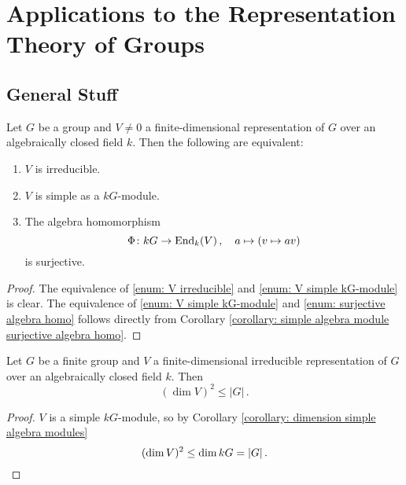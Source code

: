 \section{Applications to the Representation Theory of Groups}





\subsection*{General Stuff}


\begin{lemma}\label{lemma: equivalence to irreducible}
  Let $G$ be a group and $V \neq 0$ a finite-dimensional representation of $G$ over an algebraically closed field $k$. Then the following are equivalent:
  \begin{enumerate}[label=\emph{\roman*)},leftmargin=*]
    \item \label{enum: V irreducible}
      $V$ is irreducible.
    \item \label{enum: V simple kG-module}
      $V$ is simple as a $kG$-module.
    \item \label{enum: surjective algebra homo}
      The algebra homomorphism
      \[
                \Phi
        \colon  kG
        \to     \operatorname{End}_k(V) \,,
        \quad   a
        \mapsto (v \mapsto av)
      \]
      is surjective.
  \end{enumerate}
\end{lemma}
\begin{proof}
  The equivalence of \ref{enum: V irreducible} and \ref{enum: V simple kG-module} is clear.
  The equivalence of \ref{enum: V simple kG-module} and \ref{enum: surjective algebra homo} follows directly from Corollary \ref{corollary: simple algebra module surjective algebra homo}.
\end{proof}


\begin{corollary}
  Let $G$ be a finite group and $V$ a finite-dimensional irreducible representation of $G$ over an algebraically closed field $k$.
  Then
  \[
          \left( \dim V \right)^2
    \leq |G| \,.
  \]
\end{corollary}


\begin{proof}
  $V$ is a simple $kG$-module, so by Corollary \ref{corollary: dimension simple algebra modules}
  \[
          (\dim V)^2
    \leq  \dim kG
    =     |G| \,.
    \qedhere
  \]
\end{proof}


